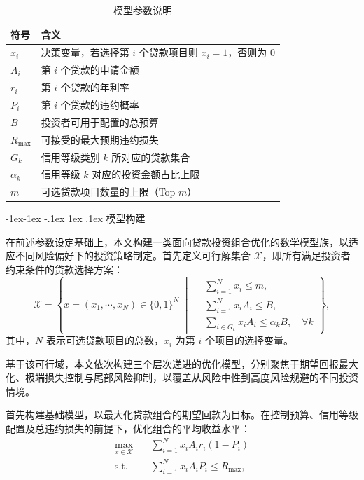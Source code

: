 \documentclass{write_paper}
\makeatletter
\renewcommand\subsection{\@startsection{subsection}{2}{\z@}%
                                     {-1ex\@plus -1ex \@minus -.1ex}%
                                     {1ex \@plus .1ex}%
                                     {\normalfont \normalsize \bfseries}}
\makeatother
\begin{document}
\begin{table}[htbp]
\centering
\caption{模型参数说明}
\label{tab:parameters}
\begin{tabular}{ll}
\toprule
符号 & 含义 \\
\midrule
$x_i$ & 决策变量，若选择第 $i$ 个贷款项目则 $x_i = 1$，否则为 $0$ \\
$A_i$ & 第 $i$ 个贷款的申请金额 \\
$r_i$ & 第 $i$ 个贷款的年利率 \\
$P_i$ & 第 $i$ 个贷款的违约概率 \\
$B$ & 投资者可用于配置的总预算 \\
$R_{\max}$ & 可接受的最大预期违约损失 \\
$G_k$ & 信用等级类别 $k$ 所对应的贷款集合 \\
$\alpha_k$ & 信用等级 $k$ 对应的投资金额占比上限 \\
$m$ & 可选贷款项目数量的上限（Top-$m$） \\
\bottomrule
\end{tabular}
\end{table}

\subsection{模型构建}

在前述参数设定基础上，本文构建一类面向贷款投资组合优化的数学模型族，以适应不同风险偏好下的投资策略制定。首先定义可行解集合 $\mathcal{X}$，即所有满足投资者约束条件的贷款选择方案：
\[
\mathcal{X} = 
\left\{ x=(x_1,\cdots,x_N) \in \{0,1\}^N \;\middle|\;
\begin{aligned}
  &\sum_{i=1}^N x_i \leq m, \\
  &\sum_{i=1}^N x_i A_i \leq B, \\
  &\sum_{i \in G_k} x_i A_i \leq \alpha_k B,\quad \forall k 
\end{aligned}
\right\},
\]
其中，$N$ 表示可选贷款项目的总数，$x_i$ 为第 $i$ 个项目的选择变量。

基于该可行域，本文依次构建三个层次递进的优化模型，分别聚焦于期望回报最大化、极端损失控制与尾部风险抑制，以覆盖从风险中性到高度风险规避的不同投资情境。

首先构建基础模型，以最大化贷款组合的期望回款为目标。在控制预算、信用等级配置及总违约损失的前提下，优化组合的平均收益水平：
\begin{equation}
\begin{aligned}
\max_{x\in\mathcal{X}} \quad & \sum_{i=1}^N x_i A_i r_i(1 - P_i) \\
\text{s.t.} \quad & \sum_{i=1}^N x_i A_i P_i \le R_{\max},
\end{aligned}
\label{eq:main_model}
\tag{P2P}
\end{equation}
\end{document}
